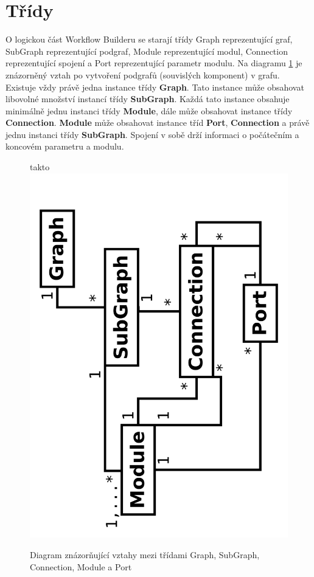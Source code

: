 \newpage
\section{Třídy}

O logickou část Workflow Builderu se starají třídy Graph reprezentující graf, SubGraph reprezentující podgraf, Module reprezentující modul, Connection reprezentující spojení a Port reprezentující parametr modulu. Na diagramu \figurename \ref{logClass} je znázorněný vztah po vytvoření podgrafů (souvislých komponent) v grafu. Existuje vždy právě jedna instance třídy \textbf{Graph}. Tato instance může obsahovat libovolné množství instancí třídy \textbf{SubGraph}. Každá tato instance obsahuje minimálně jednu instanci třídy \textbf{Module}, dále může obsahovat instance třídy \textbf{Connection}. \textbf{Module} může obsahovat instance tříd \textbf{Port}, \textbf{Connection} a právě jednu instanci třídy \textbf{SubGraph}. Spojení v sobě drží informaci o počátečním a koncovém parametru a modulu.

\begin{figure}[h]
	\begin{center}takto
		\includegraphics[scale=0.05,angle=-90]{pictures/wf/logClass.pdf}
		\caption{Diagram znázorňující vztahy mezi třídami Graph, SubGraph, Connection, Module a Port}
	  	\label{logClass}
	\end{center}
\end{figure}

